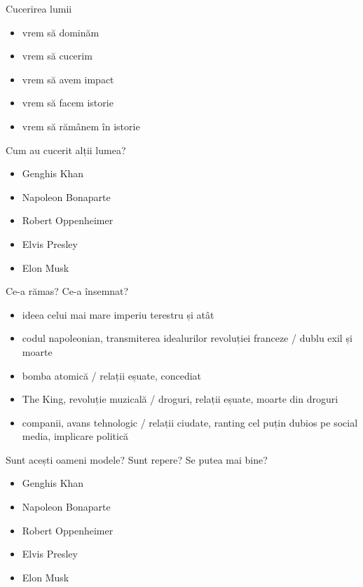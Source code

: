 \documentclass{simple}
\begin{document}
\begin{frame}{Cucerirea lumii}
  \begin{itemize}
    \pause \item vrem să dominăm
    \pause \item vrem să cucerim
    \pause \item vrem să avem impact
    \pause \item vrem să facem istorie
    \pause \item vrem să rămânem în istorie
  \end{itemize}
\end{frame}

\begin{frame}{Cum au cucerit alții lumea?}
  \begin{itemize}
    \pause \item Genghis Khan
    \pause \item Napoleon Bonaparte
    \pause \item Robert Oppenheimer
    \pause \item Elvis Presley
    \pause \item Elon Musk
  \end{itemize}
\end{frame}

\begin{frame}{Ce-a rămas? Ce-a însemnat?}
  \begin{itemize}
    \pause \item ideea celui mai mare imperiu terestru și atât
    \pause \item codul napoleonian, transmiterea idealurilor revoluției franceze / dublu exil și moarte
    \pause \item bomba atomică / relații eșuate, concediat
    \pause \item The King, revoluție muzicală / droguri, relații eșuate, moarte din droguri
    \pause \item companii, avans tehnologic / relații ciudate, ranting cel puțin dubios pe social media, implicare politică
  \end{itemize}
\end{frame}

\begin{frame}{Sunt acești oameni modele? Sunt repere? Se putea mai bine?}
  \begin{itemize}
    \item Genghis Khan
    \item Napoleon Bonaparte
    \item Robert Oppenheimer
    \item Elvis Presley
    \item Elon Musk
  \end{itemize}
\end{frame}
\end{document}
